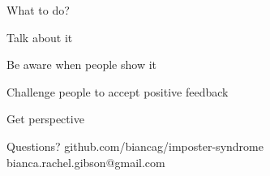 \documentclass[aspectratio=169]{beamer}
\begin{document}
\begin{frame}
  \begin{center}
    \Huge What to do?
    \small
  \end{center}
\end{frame}

\begin{frame}
  \begin{center}
    \Huge Talk about it
    \small
  \end{center}
\end{frame}

\begin{frame}
  \begin{center}
    \Huge Be aware when people show it
    \small
  \end{center}
\end{frame}

\begin{frame}
  \begin{center}
    \Huge Challenge people to accept positive feedback
  \end{center}
\end{frame}

\begin{frame}
  \begin{center}
    \Huge Get perspective
    \small
  \end{center}
\end{frame}

\begin{frame}
  \begin{center}
    \Huge Questions?
    github.com/biancag/imposter-syndrome
    bianca.rachel.gibson@gmail.com
  \end{center}
\end{frame}

\begin{frame}
  

  
\end{frame}
\end{document}
